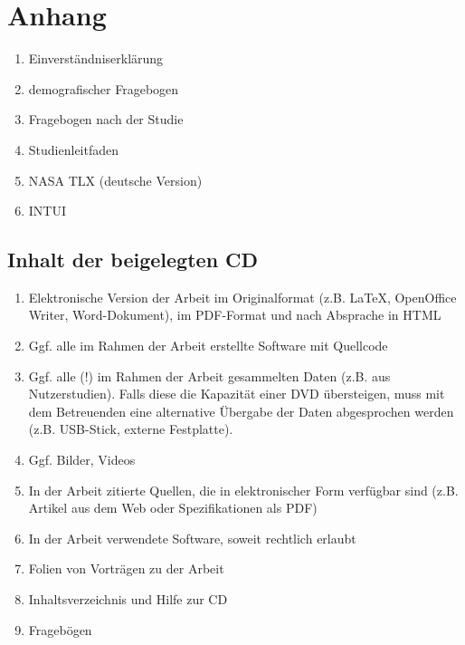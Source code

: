 \documentclass[11pt,a4paper,twoside]{book}
\begin{document}
\chapter{Anhang}\label{cha:Anhang}
\begin{enumerate}
	\item Einverständniserklärung
	\item demografischer Fragebogen
	\item Fragebogen nach der Studie
	\item Studienleitfaden
	\item NASA TLX (deutsche Version)
	\item INTUI
\end{enumerate}








\cleardoublepage
\fancyhead[LE,RO,LO,RE]{} %
\section*{Inhalt der beigelegten CD}
\begin{enumerate}
\item Elektronische Version der Arbeit im Originalformat (z.B. LaTeX, OpenOffice Writer, Word-Dokument), im PDF-Format und nach Absprache in HTML
\item Ggf. alle im Rahmen der Arbeit erstellte Software mit Quellcode
\item Ggf. alle (!) im Rahmen der Arbeit gesammelten Daten (z.B. aus Nutzerstudien). Falls diese die Kapazität einer DVD übersteigen, muss mit dem Betreuenden eine alternative Übergabe der Daten abgesprochen werden (z.B. USB-Stick, externe Festplatte).
\item Ggf. Bilder, Videos
\item In der Arbeit zitierte Quellen, die in elektronischer Form verfügbar sind (z.B. Artikel aus dem Web oder Spezifikationen als PDF)
\item In der Arbeit verwendete Software, soweit rechtlich erlaubt
\item Folien von Vorträgen zu der Arbeit
\item Inhaltsverzeichnis und Hilfe zur CD
	\item Fragebögen

\end{enumerate}
\end{document}
